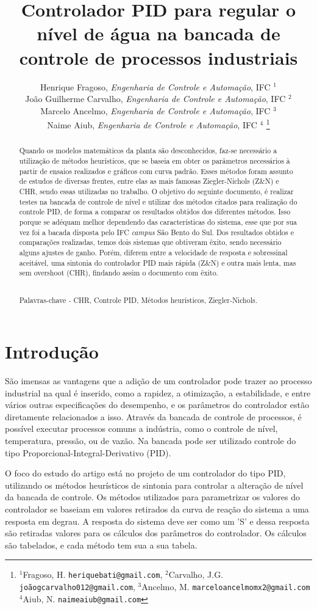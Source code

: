 \documentclass[12 pt,conference]{IEEEtran}
\title{\LARGE \bf Controlador PID para regular o nível de água na bancada de controle de processos industriais}
\author{Henrique Fragoso, \textit{Engenharia de Controle e Automação}, IFC $^{1}$ 
\\ João Guilherme Carvalho, \textit{Engenharia de Controle e Automação}, IFC $^{2}$
\\ Marcelo Ancelmo, \textit{Engenharia de Controle e Automação}, IFC $^{3}$
\\ Naime Aiub, \textit{Engenharia de Controle e Automação}, IFC $^{4}$
\thanks{$^{1}$Fragoso, H. {\tt\small heriquebati@gmail.com}, $^{2}$Carvalho, J.G. {\tt\small joãogcarvalho012@gmail.com}, $^{3}$Ancelmo, M. {\tt\small marceloancelmomx2@gmail.com} $^{4}$Aiub, N. {\tt\small naimeaiub@gmail.com}}
}
\date{}
\begin{document}
\maketitle
\thispagestyle{plain}
\pagestyle{empty}



\begin{abstract}
    Quando os modelos matemáticos da planta são desconhecidos, faz-se necessário a utilização de métodos heurísticos, que se baseia em obter os parâmetros necessários à partir de ensaios realizados e gráficos com curva padrão. Esses métodos foram assunto de estudos de diversas frentes, entre elas as mais famosas Ziegler-Nichols (Z\&N) e CHR, sendo essas utilizadas no trabalho. O objetivo do seguinte documento, é realizar testes na bancada de controle de nível e utilizar dos métodos citados para realização do controle PID, de forma a comparar os resultados obtidos dos diferentes métodos. Isso porque se adéquam melhor dependendo das características do sistema, esse que por sua vez foi a bacada disposta pelo IFC \textit{campus} São Bento do Sul. Dos resultados obtidos e comparações realizadas, temos dois sistemas que obtiveram êxito, sendo necessário alguns ajustes de ganho. Porém, diferem entre a velocidade de resposta e sobressinal aceitável, uma sintonia do controlador PID mais rápida (Z\&N) e outra mais lenta, mas sem overshoot (CHR), findando assim o documento com êxito.
    
    \\Palavras-chave\textit{ - }CHR, Controle PID, Métodos heurísticos, Ziegler-Nichols.
\end{abstract} 

    \section{Introdução}
    
        São imensas as vantagens que a adição de um controlador pode trazer ao processo industrial na qual é inserido, como a rapidez, a otimização, a estabilidade, e entre vários outras especificações do desempenho, e os parâmetros do controlador estão diretamente relacionados a isso. Através da bancada de controle de processos, é possível executar processos comuns a indústria, como o controle de nível, temperatura, pressão, ou de vazão. Na bancada pode ser utilizado controle do tipo Proporcional-Integral-Derivativo (PID).
        
        O foco do estudo do artigo está no projeto de um controlador do tipo PID, utilizando os métodos heurísticos de sintonia  para controlar a alteração de nível da bancada de controle. Os métodos utilizados para parametrizar os valores do controlador se baseiam em valores retirados da curva de reação do sistema a uma resposta em degrau. A resposta do sistema deve ser como um 'S' e dessa resposta são retiradas valores para os cálculos dos parâmetros do controlador. Os cálculos são tabelados, e cada método tem sua a sua tabela.
        
\end{document}
